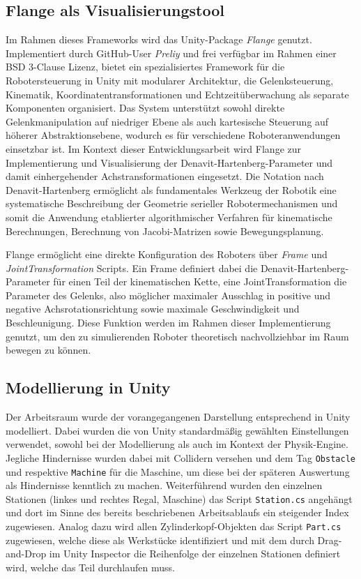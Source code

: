 \subsection{Flange als Visualisierungstool}
Im Rahmen dieses Frameworks wird das Unity-Package \textit{Flange} genutzt.
Implementiert durch GitHub-User \textit{Preliy} und frei verfügbar im Rahmen
einer BSD 3-Clause Lizenz, bietet ein spezialisiertes Framework für die
Robotersteuerung in Unity mit modularer Architektur, die Gelenksteuerung,
Kinematik, Koordinatentransformationen und Echtzeitüberwachung als separate
Komponenten organisiert. Das System unterstützt sowohl direkte
Gelenkmanipulation auf niedriger Ebene als auch kartesische Steuerung auf
höherer Abstraktionsebene, wodurch es für verschiedene Roboteranwendungen
einsetzbar ist. Im Kontext dieser Entwicklungsarbeit
wird Flange zur Implementierung und Visualisierung der
Denavit-Hartenberg-Parameter und damit einhergehender Achstransformationen
eingesetzt. Die Notation nach Denavit-Hartenberg ermöglicht als
fundamentales Werkzeug der Robotik eine
systematische Beschreibung der Geometrie serieller Robotermechanismen
und somit die Anwendung etablierter algorithmischer Verfahren für kinematische
Berechnungen, Berechnung von Jacobi-Matrizen sowie
Bewegungsplanung.

Flange ermöglicht eine direkte Konfiguration des Roboters über \textit{Frame}
und \textit{JointTransformation} Scripts. Ein Frame definiert dabei die
Denavit-Hartenberg-Parameter für einen Teil der kinematischen Kette, eine
JointTransformation die Parameter des Gelenks, also möglicher
maximaler Ausschlag
in positive und negative Achsrotationsrichtung sowie maximale Geschwindigkeit
und Beschleunigung. Diese Funktion werden im Rahmen dieser Implementierung
genutzt, um den zu simulierenden Roboter theoretisch nachvollziehbar im Raum
bewegen zu können.

\subsection{Modellierung in Unity}
Der Arbeitsraum wurde der vorangegangenen Darstellung entsprechend in Unity
modelliert. Dabei wurden die von Unity standardmäßig gewählten Einstellungen
verwendet, sowohl bei der Modellierung als auch im Kontext der
Physik-Engine. Jegliche Hindernisse wurden dabei mit Collidern versehen und dem
Tag \texttt{Obstacle} und respektive \texttt{Machine} für die Maschine, um diese
bei der späteren Auswertung als Hindernisse kenntlich zu machen. Weiterführend
wurden den einzelnen Stationen (linkes und rechtes Regal, Maschine) das Script
\texttt{Station.cs} angehängt und dort im Sinne des bereits beschriebenen
Arbeitsablaufs ein steigender Index zugewiesen. Analog dazu wird allen
Zylinderkopf-Objekten das Script \texttt{Part.cs} zugewiesen, welche diese als
Werkstücke identifiziert und mit dem durch Drag-and-Drop im Unity Inspector die
Reihenfolge der einzelnen Stationen definiert wird, welche das Teil durchlaufen
muss.

